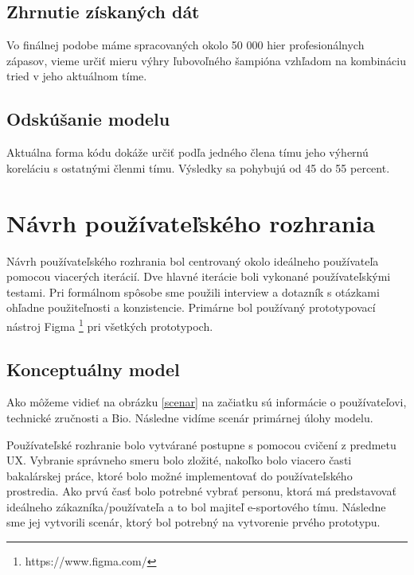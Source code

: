 \subsection{Zhrnutie získaných dát}
Vo finálnej podobe máme spracovaných okolo 50 000 hier profesionálnych zápasov, vieme určiť mieru výhry ľubovoľného šampióna vzhľadom na kombináciu tried v jeho aktuálnom tíme.
\subsection{Odskúšanie modelu}
Aktuálna forma kódu dokáže určiť podľa jedného člena tímu jeho výhernú koreláciu s ostatnými členmi tímu. Výsledky sa pohybujú od 45 do 55 percent.

\section{Návrh používateľského rozhrania}

\label{summary}

Návrh používateľského rozhrania bol centrovaný okolo ideálneho používateľa pomocou viacerých iterácií. Dve hlavné iterácie boli vykonané používateľskými testami. Pri formálnom spôsobe sme použili interview a dotazník s otázkami ohľadne použiteľnosti a konzistencie. Primárne bol používaný prototypovací nástroj Figma \footnote{https://www.figma.com/} pri všetkých prototypoch.



\subsection{Konceptuálny model}

Ako môžeme vidieť na obrázku \ref{scenar} na začiatku sú informácie o používateľovi, technické zručnosti a Bio. Následne vidíme scenár primárnej úlohy modelu.

Používateľské rozhranie bolo vytvárané postupne s pomocou cvičení z predmetu UX. Vybranie správneho smeru bolo zložité, nakoľko bolo viacero časti bakalárskej práce, ktoré bolo možné implementovať do používateľského prostredia. Ako prvú časť bolo potrebné vybrať personu, ktorá má predstavovať ideálneho zákazníka/používateľa a to bol majiteľ e-sportového tímu. Následne sme jej vytvorili scenár, ktorý bol potrebný na vytvorenie prvého prototypu. 

